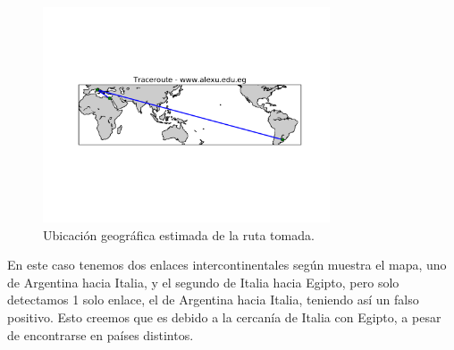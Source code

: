 \begin{figure}[H]
    \centering
    \includegraphics[width=8.5cm]{img/grafico3-www-alexu-edu-eg.pdf}
    \caption{\normalfont Ubicación geográfica estimada de la ruta tomada.}
\end{figure}

En este caso tenemos dos enlaces intercontinentales según muestra el mapa, uno de Argentina hacia Italia, y el segundo de Italia 
hacia Egipto, pero solo detectamos 1 solo enlace, el de Argentina hacia Italia, teniendo así un falso positivo. 
Esto creemos que es debido a la cercanía de Italia con Egipto, a pesar de encontrarse en países distintos. 


